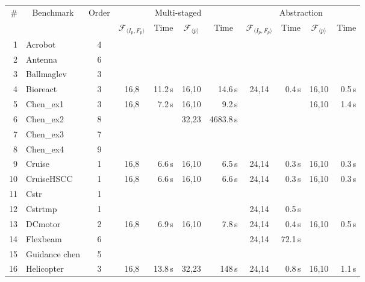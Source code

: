 \documentclass[twocolumn]{autart}    %
\newcommand{\xmark}{\ding{55}}
\begin{document}
\begin{table}
\centering
\begin{tabular}{| r | l | c | c | r | c | r | c | r | c | r |}
%
\hline
\# & \multicolumn{1}{|c|}{Benchmark} & \multicolumn{1}{|c|}{Order} & \multicolumn{4}{|c|}{Multi-staged}                 & \multicolumn{4}{|c|}{Abstraction} \\
   &                                  & & \multicolumn{1}{|c|}{$\mathcal{F}_{\langle I_p,F_p \rangle}$} & \multicolumn{1}{|c|}{Time} & \multicolumn{1}{|c|}{$\mathcal{F}_{\langle p \rangle}$} & \multicolumn{1}{|c|}{Time} & \multicolumn{1}{|c|}{$\mathcal{F}_{\langle I_p,F_p \rangle}$} & \multicolumn{1}{|c|}{Time} & \multicolumn{1}{|c|}{$\mathcal{F}_{\langle p \rangle}$} & \multicolumn{1}{|c|}{Time}\\\hline
1  & Acrobot  & 4 &  & \xmark &  & ~\xmark & & ~\xmark &  & ~\xmark \\
2  & Antenna  & 6 &  & ~\xmark &  & ~\xmark & & ~\xmark & & ~\xmark\\
3  & Ballmaglev  & 3 &  & ~\xmark &  & ~\xmark & & ~\xmark & & ~\xmark\\
4  & Bioreact & 3 & 16,8 & 11.2\,s & 16,10 &14.6\,s & 24,14 & 0.4\,s & 16,10 & 0.5\,s\\
5  & Chen\_ex1& 3 & 16,8 & 7.2\,s  & 16,10 & 9.2\,s & & ~\xmark & 16,10 & 1.4\,s\\
6  & Chen\_ex2 & 8& & ~\xmark & 32,23 & 4683.8\,s &  & ~\xmark & & ~\xmark\\
7  & Chen\_ex3 & 7 &   & ~\xmark & & ~\xmark & & ~\xmark & & ~\xmark\\
8  & Chen\_ex4 & 9 & & ~\xmark & & ~\xmark & & ~\xmark & & ~\xmark\\
9  & Cruise    & 1 & 16,8 & 6.6\,s & 16,10 & 6.5\,s & 24,14 & 0.3\,s& 16,10 & 0.3\,s\\
10 & CruiseHSCC & 1 & 16,8 & 6.6\,s & 16,10 & 6.6\,s &  24,14 & 0.3\,s & 16,10 & 0.3\,s \\
11 & Cstr & 1 & & ~\xmark & & ~\xmark & & ~\xmark & & ~\xmark\\
12 & Cstrtmp  & 1 &  & ~\xmark & & ~\xmark & 24,14 & 0.5\,s & & ~\xmark\\
13 & DCmotor   & 2 & 16,8  & 6.9\,s & 16,10 & 7.8\,s & 24,14 & 0.4\,s & 16,10 & 0.5\,s \\
14 & Flexbeam   & 6 & & ~\xmark & & ~\xmark & 24,14 & 72.1\,s & & ~\xmark\\
15 & Guidance chen  & 5 & & ~\xmark & & ~\xmark & & ~\xmark & & ~\xmark\\
16 & Helicopter   & 3 & 16,8 & 13.8\,s & 32,23 & 148\,s & 24,14 & 0.8\,s& 16,10 & 1.1\,s\\

\end{tabular}
\end{table}
\end{document}
